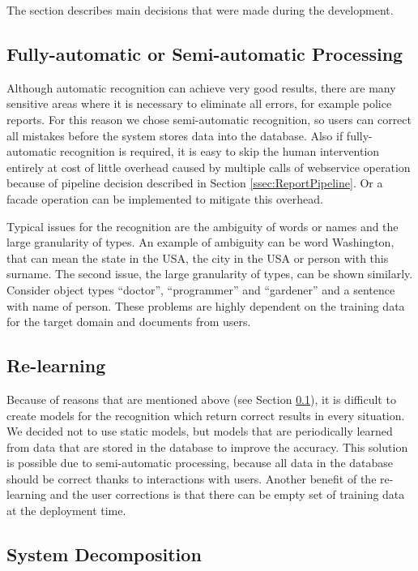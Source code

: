 
The section describes main decisions that were made during the development. 

\subsection{Fully-automatic or Semi-automatic Processing}
\label{ssec:processing}

Although automatic recognition can achieve very good results, there are many
sensitive areas where it is necessary to eliminate all errors, for example
police reports. For this reason we chose semi-automatic recognition, so users
can correct all mistakes before the system stores data into the database. 
Also if fully-automatic recognition is required, it is easy
to skip the human intervention entirely at cost of little overhead caused by
multiple calls of webservice operation because of pipeline decision described in
Section \ref{ssec:ReportPipeline}. Or a facade operation can be implemented to
mitigate this overhead.

Typical issues for the recognition are the ambiguity of words or names and the
large granularity of types. An example of ambiguity can be word Washington, that
can mean the state in the USA, the city in the USA or person with this surname.
The second issue, the large granularity of types, can be shown similarly.
Consider object types ``doctor'', ``programmer'' and ``gardener'' and a sentence with
name of person. These problems are highly dependent on the training data for the
target domain and documents from users.

\subsection{Re-learning}

Because of reasons that are mentioned above (see Section \ref{ssec:processing}),
it is difficult to create models for the recognition which return correct
results in every situation. We decided not to use static models, but models that
are periodically learned from data that are stored in the database to improve
the accuracy. This solution is possible due to semi-automatic processing,
because all data in the database should be correct thanks to interactions with
users. Another benefit of the re-learning and the user corrections is that there
can be empty set of training data at the deployment time.

\subsection{System Decomposition}

